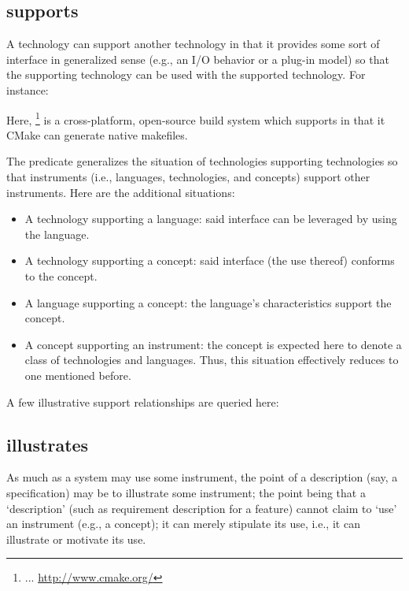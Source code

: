 \subsection{supports}

A technology can support another technology in that it provides some
sort of interface in generalized sense (e.g., an I/O behavior or a
plug-in model) so that the supporting technology can be used with the
supported technology. For instance:


\noindent
Here, \footnote{... 
  \url{http://www.cmake.org/}} is a cross-platform, open-source build
system which supports  in that it CMake can generate
native makefiles.

The predicate  generalizes the situation of
technologies supporting technologies so that instruments (i.e.,
languages, technologies, and concepts) support other instruments. Here
are the additional situations:
%
\begin{itemize}
\item A technology supporting a language: said interface can be
  leveraged by using the language.
\item A technology supporting a concept: said interface (the use
  thereof) conforms to the concept.
\item A language supporting a concept: the language's characteristics
  support the concept.
\item A concept supporting an instrument: the concept is expected here
  to denote a class of technologies and languages. Thus, this
  situation effectively reduces to one mentioned before.
\end{itemize}

\noindent
A few illustrative support relationships are queried here:




\subsection{illustrates}

As much as a system may use some instrument, the point of a
description (say, a specification) may be to illustrate some
instrument; the point being that a `description' (such as requirement
description for a feature) cannot claim to `use' an instrument (e.g.,
a concept); it can merely stipulate its use, i.e., it can illustrate
or motivate its use.

